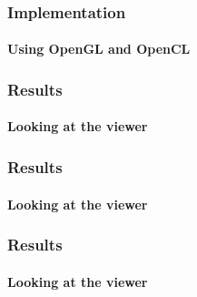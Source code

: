 \documentclass[
    beamer                                       %
  ,table,dvipsnames,svgnames
]{common/mytemplate}
\begin{document}
% 
% 
\begin{frame}
\frametitle{Implementation}
\framesubtitle{Using OpenGL and OpenCL}
\vspace{-15pt}
\begin{figure}[H]
\begin{narrow}{-0.9cm}{-0.9cm}
\end{narrow}
\end{figure}
\end{frame}


{
%
\begin{frame}
\frametitle{Results}
\framesubtitle{Looking at the viewer}
\vspace{8cm}
\end{frame}
}

{
%
\begin{frame}
\frametitle{Results}
\framesubtitle{Looking at the viewer}
\vspace{8cm}
\end{frame}
}

{
%
\begin{frame}
\frametitle{Results}
\framesubtitle{Looking at the viewer}
\vspace{8cm}
\end{frame}
}
\end{document}
